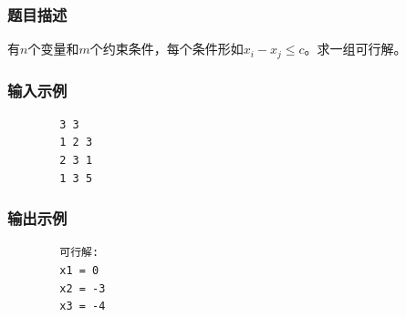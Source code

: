 \documentclass[12pt,a4paper]{ctexart}
\begin{document}
	\subsubsection*{题目描述}
	有$n$个变量和$m$个约束条件，每个条件形如$x_i - x_j \le c$。求一组可行解。
	\subsubsection*{输入示例}
	\begin{verbatim}
		3 3
		1 2 3
		2 3 1
		1 3 5
	\end{verbatim}
	\subsubsection*{输出示例}
	\begin{verbatim}
		可行解:
		x1 = 0
		x2 = -3
		x3 = -4
	\end{verbatim}
\end{document}
